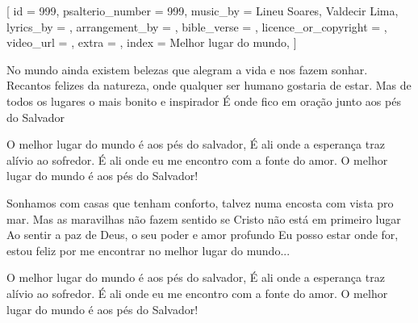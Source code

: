 
[
    id                     = {999},
    psalterio_number       = {999},
    music_by               = {Lineu Soares, Valdecir Lima},
    lyrics_by              = {},
    arrangement_by         = {},
    bible_verse            = {},
    licence_or_copyright   = {},
    video_url              = {},
    extra                  = {},
    index                  = {Melhor lugar do mundo},
]


\beginverse

No mundo ainda existem belezas que alegram a vida e nos fazem sonhar.
Recantos felizes da natureza, onde qualquer ser humano gostaria de estar.
Mas de todos os lugares o mais bonito e inspirador
É onde fico em oração junto aos pés do Salvador

\endverse


\beginchorus

O melhor lugar do mundo é aos pés do salvador,
É ali onde a esperança traz alívio ao sofredor.
É ali onde eu me encontro com a fonte do amor.
O melhor lugar do mundo é aos pés do Salvador!

\endchorus


\beginverse

Sonhamos com casas que tenham conforto, talvez numa encosta com vista pro mar.
Mas as maravilhas não fazem sentido se Cristo não está em primeiro lugar
Ao sentir a paz de Deus, o seu poder e amor profundo
Eu posso estar onde for, estou feliz por me encontrar no melhor lugar do mundo...

\endverse



\beginchorus

O melhor lugar do mundo é aos pés do salvador,
É ali onde a esperança traz alívio ao sofredor.
É ali onde eu me encontro com a fonte do amor.
O melhor lugar do mundo é aos pés do Salvador!

\endchorus



\endsong
